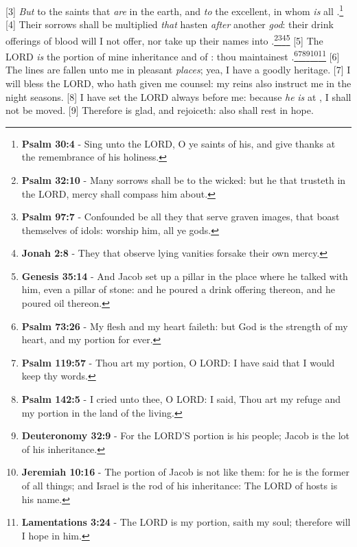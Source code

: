 [3] \textcolor[cmyk]{0.99998,1,0,0}{\emph{But} to the saints that \emph{are} in the earth, and \emph{to} the excellent, in whom \emph{is} all .}\footnote{\textbf{Psalm 30:4} - Sing unto the LORD, O ye saints of his, and give thanks at the remembrance of his holiness.}
[4] \textcolor[cmyk]{0.99998,1,0,0}{Their sorrows shall be multiplied \emph{that} hasten \emph{after} another \emph{god}: their drink offerings of blood will I not offer, nor take up their names into .}\footnote{\textbf{Psalm 32:10} - Many sorrows shall be to the wicked: but he that trusteth in the LORD, mercy shall compass him about.}\footnote{\textbf{Psalm 97:7} - Confounded be all they that serve graven images, that boast themselves of idols: worship him, all ye gods.}\footnote{\textbf{Jonah 2:8} - They that observe lying vanities forsake their own mercy.}\footnote{\textbf{Genesis 35:14} - And Jacob set up a pillar in the place where he talked with him, even a pillar of stone: and he poured a drink offering thereon, and he poured oil thereon.}
[5] \textcolor[cmyk]{0.99998,1,0,0}{The LORD \emph{is} the portion of mine inheritance and of : thou maintainest .}\footnote{\textbf{Psalm 73:26} - My flesh and my heart faileth: but God is the strength of my heart, and my portion for ever.}\footnote{\textbf{Psalm 119:57} - Thou art my portion, O LORD: I have said that I would keep thy words.}\footnote{\textbf{Psalm 142:5} - I cried unto thee, O LORD: I said, Thou art my refuge and my portion in the land of the living.}\footnote{\textbf{Deuteronomy 32:9} - For the LORD'S portion is his people; Jacob is the lot of his inheritance.}\footnote{\textbf{Jeremiah 10:16} - The portion of Jacob is not like them: for he is the former of all things; and Israel is the rod of his inheritance: The LORD of hosts is his name.}\footnote{\textbf{Lamentations 3:24} - The LORD is my portion, saith my soul; therefore will I hope in him.}
[6] \textcolor[cmyk]{0.99998,1,0,0}{The lines are fallen unto me in pleasant \emph{places}; yea, I have a goodly heritage.}
[7] \textcolor[cmyk]{0.99998,1,0,0}{I will bless the LORD, who hath given me counsel: my reins also instruct me in the night seasons.}
[8] \textcolor[cmyk]{0.99998,1,0,0}{I have set the LORD always before me: because \emph{he} \emph{is} at , I shall not be moved.}
[9] \textcolor[cmyk]{0.99998,1,0,0}{Therefore  is glad, and  rejoiceth:  also shall rest in hope.}
